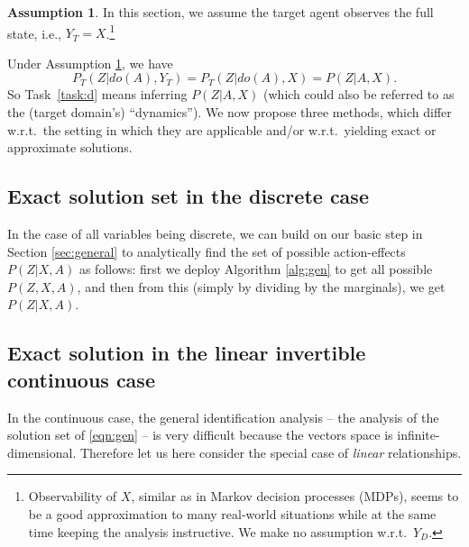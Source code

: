 \documentclass[letterpaper]{article} %
\theoremstyle{definition}%
\theoremstyle{definition}
\newtheorem{assumption}{Assumption} %
\newcommand{\dob}[1]{do(#1)}
\newcommand{\Out}{Z}
\newcommand{\todo}[1]{\textcolor{red}{#1}}
\begin{document}
\begin{assumption}
	\label{asm:d}
	In this section, we assume the target agent observes the full state, i.e., $Y_T{=}X$.\footnote{Observability of $X$, similar as in Markov decision processes (MDPs), seems to be a good approximation to many real-world situations while at the same time keeping the analysis instructive. We make no assumption w.r.t.\ $Y_D$.}
\end{assumption}

Under Assumption \ref{asm:d}, we have
$$
P_T(\Out|\dob{A}, Y_T) = P_T(\Out|\dob{A}, X) = P(\Out|A, X).
$$
 So Task~\ref{task:d} means inferring $P(\Out|A, X)$  (which could also be referred to as the (target domain's) ``dynamics'').
We now propose three methods, which differ w.r.t.\ the setting in which they are applicable and/or w.r.t.\ yielding exact or approximate solutions.





\subsection{Exact solution set in the discrete case}
\label{sec:deex}

In the case of all variables being discrete, we can build on our basic step in Section \ref{sec:general} to analytically find the set of possible action-effects $P(\Out|X, A)$ as follows: first we deploy Algorithm \ref{alg:gen} to get all possible $P(\Out,X, A)$, and then from this (simply by dividing by the marginals), we get  $P(\Out|X, A)$.




\subsection{Exact solution in the linear invertible continuous case}
\label{sec:deexlin}


In the continuous case, the general identification analysis -- the analysis of the solution set of \eqref{eqn:gen} -- is very difficult because the vectors space is infinite-dimensional.
Therefore let us here consider the special case of \emph{linear} relationships.
\end{document}
